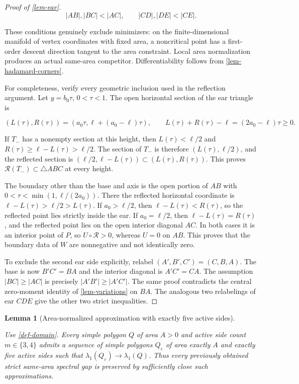 \documentclass[11pt,a4paper]{article}
\theoremstyle{proofmanuscript}
\newtheorem{lemma}[theorem]{Lemma}
\begin{document}
\begin{proof}[Proof of \ref{lem-ear}]
\[
\boxed{|AB|,|BC|<|AC|,\qquad |CD|,|DE|<|CE|.}
\tag{G.6.2}
\]

These conditions genuinely exclude minimizers: on the finite-dimensional manifold of vertex coordinates with fixed area, a noncritical point has a first-order descent direction tangent to the area constraint. Local area normalization produces an actual same-area competitor. Differentiability follows from \ref{lem-hadamard-corners}.

For completeness, verify every geometric inclusion used in the reflection argument. Let \(y=b_0\tau\), \(0<\tau<1\). The open horizontal section of the ear triangle is

\[
(L(\tau),R(\tau))=(a_0\tau,\ell+(a_0-\ell)\tau),\qquad
L(\tau)+R(\tau)-\ell=(2a_0-\ell)\tau\ge0.
\]

If \(T_-\) has a nonempty section at this height, then \(L(\tau)<\ell/2\) and \(R(\tau)\ge\ell-L(\tau)>\ell/2\). The section of \(T_-\) is therefore \((L(\tau),\ell/2)\), and the reflected section is \((\ell/2,\ell-L(\tau))\subset(L(\tau),R(\tau))\). This proves \(\mathcal R(T_-)\subset\triangle ABC\) at every height.

The boundary other than the base and axis is the open portion of \(AB\) with \(0<\tau<\min(1,\ell/(2a_0))\). There the reflected horizontal coordinate is \(\ell-L(\tau)>\ell/2>L(\tau)\). If \(a_0>\ell/2\), then \(\ell-L(\tau)<R(\tau)\), so the reflected point lies strictly inside the ear. If \(a_0=\ell/2\), then \(\ell-L(\tau)=R(\tau)\), and the reflected point lies on the open interior diagonal \(AC\). In both cases it is an interior point of \(P\), so \(U\circ\mathcal R>0\), whereas \(U=0\) on \(AB\). This proves that the boundary data of \(W\) are nonnegative and not identically zero.

To exclude the second ear side explicitly, relabel \((A',B',C')=(C,B,A)\). The base is now \(B'C'=BA\) and the interior diagonal is \(A'C'=CA\). The assumption \(|BC|\ge|AC|\) is precisely \(|A'B'|\ge|A'C'|\). The same proof contradicts the central zero-moment identity of \ref{lem-variations} on \(BA\). The analogous two relabelings of ear \(CDE\) give the other two strict inequalities.

\end{proof}

\begin{lemma}[Area-normalized approximation with exactly five active sides]\label{lem-five-edge-approximation}

Use \ref{def-domain}. Every simple polygon \(Q\) of area \(A>0\) and active side count \(m\in\{3,4\}\) admits a sequence of simple polygons \(Q_\varepsilon\) of area exactly \(A\) and exactly five active sides such that \(\lambda_1(Q_\varepsilon)\to\lambda_1(Q)\). Thus every previously obtained strict same-area spectral gap is preserved by sufficiently close such approximations.

\end{lemma}
\end{document}
